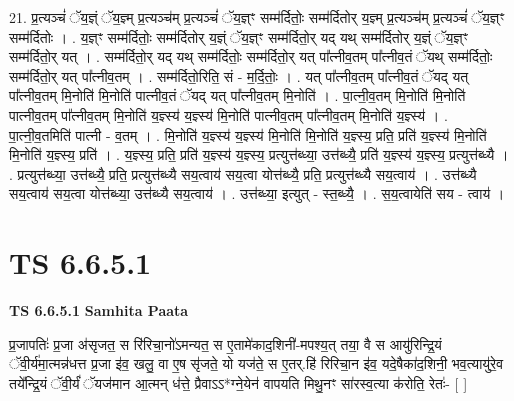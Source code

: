 \documentclass[17pt]{extarticle}
\begin{document}
21. प्र॒त्यञ्चं॑ ॅय॒ज्ञ्ं ॅय॒ज्ञ्म् प्र॒त्यञ्च॑म् प्र॒त्यञ्चं॑ ॅय॒ज्ञ्ꣳ सम्म॑र्दितोः॒ सम्म॑र्दितोर् य॒ज्ञ्म् प्र॒त्यञ्च॑म् प्र॒त्यञ्चं॑ ॅय॒ज्ञ्ꣳ सम्म॑र्दितोः । . य॒ज्ञ्ꣳ सम्म॑र्दितोः॒ सम्म॑र्दितोर् य॒ज्ञ्ं ॅय॒ज्ञ्ꣳ सम्म॑र्दितो॒र् यद् यथ् सम्म॑र्दितोर् य॒ज्ञ्ं ॅय॒ज्ञ्ꣳ सम्म॑र्दितो॒र् यत् । . सम्म॑र्दितो॒र् यद् यथ् सम्म॑र्दितोः॒ सम्म॑र्दितो॒र् यत् पा᳚त्नीव॒तम् पा᳚त्नीव॒तं ॅयथ् सम्म॑र्दितोः॒ सम्म॑र्दितो॒र् यत् पा᳚त्नीव॒तम् । . सम्म॑र्दितो॒रिति॒ सं - म॒र्दि॒तोः॒ । . यत् पा᳚त्नीव॒तम् पा᳚त्नीव॒तं ॅयद् यत् पा᳚त्नीव॒तम् मि॒नोति॑ मि॒नोति॑ पात्नीव॒तं ॅयद् यत् पा᳚त्नीव॒तम् मि॒नोति॑ । . पा॒त्नी॒व॒तम् मि॒नोति॑ मि॒नोति॑ पात्नीव॒तम् पा᳚त्नीव॒तम् मि॒नोति॑ य॒ज्ञ्स्य॑ य॒ज्ञ्स्य॑ मि॒नोति॑ पात्नीव॒तम् पा᳚त्नीव॒तम् मि॒नोति॑ य॒ज्ञ्स्य॑ । . पा॒त्नी॒व॒तमिति॑ पात्नी - व॒तम् । . मि॒नोति॑ य॒ज्ञ्स्य॑ य॒ज्ञ्स्य॑ मि॒नोति॑ मि॒नोति॑ य॒ज्ञ्स्य॒ प्रति॒ प्रति॑ य॒ज्ञ्स्य॑ मि॒नोति॑ मि॒नोति॑ य॒ज्ञ्स्य॒ प्रति॑ । . य॒ज्ञ्स्य॒ प्रति॒ प्रति॑ य॒ज्ञ्स्य॑ य॒ज्ञ्स्य॒ प्रत्युत्त॑ब्ध्या॒ उत्त॑ब्ध्यै॒ प्रति॑ य॒ज्ञ्स्य॑ य॒ज्ञ्स्य॒ 
प्रत्युत्त॑ब्ध्यै । . प्रत्युत्त॑ब्ध्या॒ उत्त॑ब्ध्यै॒ प्रति॒ प्रत्युत्त॑ब्ध्यै सय॒त्वाय॑ सय॒त्वा योत्त॑ब्ध्यै॒ प्रति॒ प्रत्युत्त॑ब्ध्यै सय॒त्वाय॑ । . उत्त॑ब्ध्यै सय॒त्वाय॑ सय॒त्वा योत्त॑ब्ध्या॒ उत्त॑ब्ध्यै सय॒त्वाय॑ । . उत्त॑ब्ध्या॒ इत्युत् - स्त॒ब्ध्यै॒ । . स॒य॒त्वायेति॑ सय - त्वाय॑ । \newline
\pagebreak
{}

\section{ TS 6.6.5.1 }

\textbf{TS 6.6.5.1 } \newline
\textbf{Samhita Paata} \newline

प्र॒जापतिः॑ प्र॒जा अ॑सृजत॒ स रि॑रिचा॒नो॑ऽमन्यत॒ स ए॒तामे॑काद॒शिनी॑-मपश्य॒त् तया॒ वै स आयु॑रिन्द्रि॒यं ॅवी॒र्य॑मा॒त्मन्न॑धत्त प्र॒जा इ॑व॒ खलु॒ वा ए॒ष सृ॑जते॒ यो यज॑ते॒ स ए॒तर्.हि॑ रिरिचा॒न इ॑व॒ यदे॒षैका॑द॒शिनी॒ भव॒त्यायु॑रे॒व तये᳚न्द्रि॒यं ॅवी॒र्यं॑ ॅयज॑मान आ॒त्मन् ध॑त्ते॒ प्रैवाऽऽ*ग्ने॒येन॑ वापयति मिथु॒नꣳ सा॑रस्व॒त्या क॑रोति॒ रेतः॑- [  ] \newline
\end{document}
